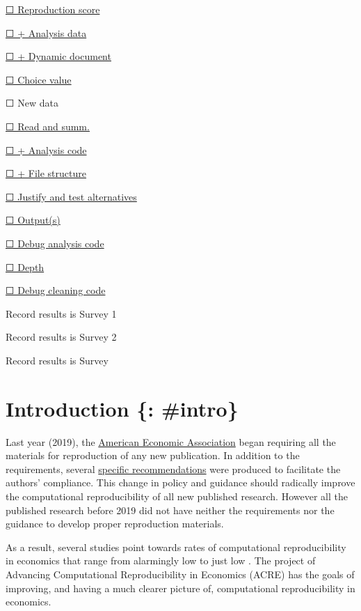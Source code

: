 \documentclass[]{book}
\begin{document}
\protect\hyperlink{score}{☐ Reproduction score}

\protect\hyperlink{ad}{☐ + Analysis data}

\protect\hyperlink{paper-level}{☐ + Dynamic document}

\protect\hyperlink{id-val}{☐ Choice value}

☐ New data

\protect\hyperlink{read-summ}{☐ Read and summ.}

\protect\hyperlink{ac}{☐ + Analysis code}

\protect\hyperlink{paper-level}{☐ + File structure}

\protect\hyperlink{test-rob}{☐ Justify and test alternatives}

\protect\hyperlink{outputs}{☐ Output(s)}

\protect\hyperlink{dac}{☐ Debug analysis code}

\protect\hyperlink{intensive}{☐ Depth}

\protect\hyperlink{dcc}{☐ Debug cleaning code}

Record results is Survey 1

Record results is Survey 2

Record results is Survey

\hypertarget{introduction-intro}{%
\chapter{Introduction \{: \#intro\}}\label{introduction-intro}}

Last year (2019), the \href{https://www.aeaweb.org/journals/policies/data-code/}{American Economic Association} began requiring all the materials for reproduction of any new publication. In addition to the requirements, several \href{https://aeadataeditor.github.io/aea-de-guidance/}{specific recommendations} were produced to facilitate the authors' compliance. This change in policy and guidance should radically improve the computational reproducibility of all new published research. However all the published research before 2019 did not have neither the requirements nor the guidance to develop proper reproduction materials.

As a result, several studies point towards rates of computational reproducibility in economics that range from alarmingly low \citep{galiani2018make, chang2015economics} to just low \citep{kingi2018reproducibility}. The project of Advancing Computational Reproducibility in Economics (ACRE) has the goals of improving, and having a much clearer picture of, computational reproducibility in economics.
\end{document}
